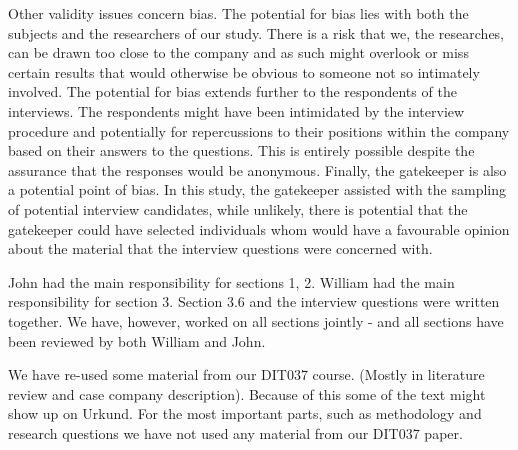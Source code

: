 \documentclass[10pt,twocolumn]{article}
\begin{document}
Other validity issues concern bias. The potential for bias lies with both the subjects and the researchers of our study. There is a risk that we, the researches, can be drawn too close to the company and as such might overlook or miss certain results that would otherwise be obvious to someone not so intimately involved. The potential for bias extends further to the respondents of the interviews. The respondents might have been intimidated by the interview procedure and potentially for repercussions to their positions within the company based on their answers to the questions. This is entirely possible despite the assurance that the responses would be anonymous. Finally, the gatekeeper is also a potential point of bias. In this study, the gatekeeper assisted with the sampling of potential interview candidates, while unlikely, there is potential that the gatekeeper could have selected individuals whom would have a favourable opinion about the material that the interview questions were concerned with.






John had the main responsibility for sections 1, 2. William had the main responsibility for section 3. Section 3.6 and the interview questions were written together. We have, however, worked on all sections jointly - and all sections have been reviewed by both William and John. 

We have re-used some material from our DIT037 course. (Mostly in literature review and case company description). Because of this some of the text might show up on Urkund. For the most important parts, such as methodology and research questions we have not used any material from our DIT037 paper. 
\end{document}
